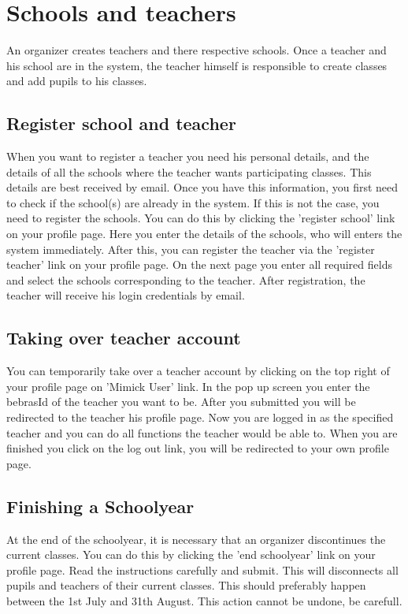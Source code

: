 \documentclass[11pt,a4paper]{report}
\begin{document}
\section{Schools and teachers}
An organizer creates teachers and there respective schools. Once a teacher and his school are in the system, the teacher himself is responsible to create classes and add pupils to his classes. 
\subsection{Register school and teacher}
When you want to register a teacher you need his personal details, and the details of all the schools where the teacher wants participating classes. This details are best received by email. Once you have this information, you first need to check if the school(s) are already in the system. If this is not the case, you need to register the schools. You can do this by clicking the 'register school' link on your profile page. Here you enter the details of the schools, who will enters the system immediately. After this, you can register the teacher via the 'register teacher' link on your profile page. On the next page you enter all required fields and select the schools corresponding to the teacher. After registration, the teacher will receive his login credentials by email.

\subsection{Taking over teacher account}
You can temporarily take over a teacher account by clicking on the top right of your profile page on 'Mimick User' link. In the pop up screen you enter the bebrasId of the teacher you want to be. After you submitted you will be redirected to the teacher his profile page. Now you are logged in as the specified teacher and you can do all functions the teacher would be able to. When you are finished you click on the log out link, you will be redirected to your own profile page. 

\subsection{Finishing a Schoolyear}
At the end of the schoolyear, it is necessary that an organizer discontinues the current classes. You can do this by clicking the 'end schoolyear' link on your profile page. Read the instructions carefully and submit. This will disconnects all pupils and teachers of their current classes. This should preferably happen between the 1st July and 31th August. This action cannot be undone, be carefull.  
\end{document}
